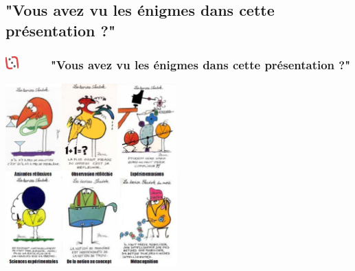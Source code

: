 \documentclass[slidetop,11pt]{beamer}
\def\moreInFrameTitleLeftt{\includegraphics[height=0.5cm]{img/ligueludique-0.png}~~~~~}
\begin{document}
\def\sectionPartIIIc{"Vous avez vu les {\'e}nigmes dans cette pr{\'e}sentation ?"}
\subsection{\sectionPartIIIc}
\begin{frame}
	\frametitle{\moreInFrameTitleLeftt \sectionPartIIIc}
	\begin{center}
		\includegraphics[height=7.0cm]{img/shadoks_devises.png} %
	\end{center}
\end{frame}
\end{document}
